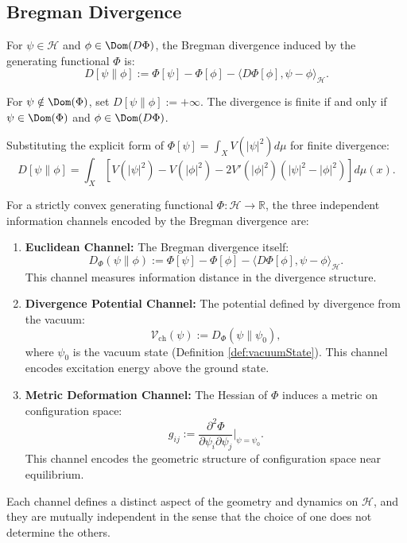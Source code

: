 \subsection{Bregman Divergence}
\label{subsec:bregmanDivergence}

\begin{definition}
\label{def:bregman}
For $\psi \in \mathcal{H}$ and $\phi \in \Dom(D\Phi)$, the Bregman divergence induced by the generating functional $\Phi$ is:
\begin{equation}
D[\psi \| \phi] := \Phi[\psi] - \Phi[\phi] - \langle D\Phi[\phi], \psi - \phi \rangle_{\mathcal{H}}.
\end{equation}

For $\psi \notin \Dom(\Phi)$, set $D[\psi \| \phi] := +\infty$. The divergence is finite if and only if $\psi \in \Dom(\Phi)$ and $\phi \in \Dom(D\Phi)$.

Substituting the explicit form of $\Phi[\psi] = \int_X V(|\psi|^2) d\mu$ for finite divergence:
\begin{equation}
D[\psi \| \phi] = \int_X \left[V(|\psi|^2) - V(|\phi|^2) - 2V'(|\phi|^2)(|\psi|^2 - |\phi|^2)\right] d\mu(x).
\end{equation}

\begin{definition}
\label{def:bregmanChannels}
For a strictly convex generating functional $\Phi: \mathcal{H} \to \mathbb{R}$, the three independent information channels encoded by the Bregman divergence are:
\begin{enumerate}
    \item \textbf{Euclidean Channel:} The Bregman divergence itself:
    \[
    D_{\Phi}(\psi \| \phi) := \Phi[\psi] - \Phi[\phi] - \langle D\Phi[\phi], \psi - \phi \rangle_{\mathcal{H}}.
    \]
    This channel measures information distance in the divergence structure.
    
    \item \textbf{Divergence Potential Channel:} The potential defined by divergence from the vacuum:
    \[
    \mathcal{V}_{\text{ch}}(\psi) := D_{\Phi}(\psi \| \psi_0),
    \]
    where $\psi_0$ is the vacuum state (Definition \ref{def:vacuumState}). This channel encodes excitation energy above the ground state.
    
    \item \textbf{Metric Deformation Channel:} The Hessian of $\Phi$ induces a metric on configuration space:
    \[
    g_{ij} := \frac{\partial^2 \Phi}{\partial \psi_i \partial \psi_j}\bigg|_{\psi=\psi_0}.
    \]
    This channel encodes the geometric structure of configuration space near equilibrium.
\end{enumerate}
Each channel defines a distinct aspect of the geometry and dynamics on $\mathcal{H}$, and they are mutually independent in the sense that the choice of one does not determine the others.
\end{definition}


\end{definition}
